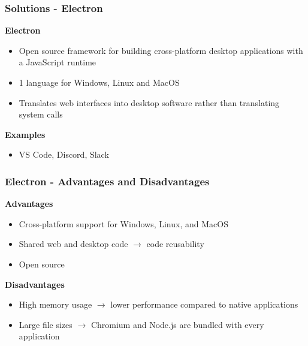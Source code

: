 \begin{frame}
\frametitle{Solutions - Electron}
\begin{redbox}
\textbf{Electron}
\begin{itemize}
    \setlength{\itemsep}{8pt}
    \item Open source framework for building cross-platform desktop applications with a JavaScript runtime \cite{electron-why-page}
    \item 1 language for Windows, Linux and MacOS \cite{electron-why-page}
    \item Translates web interfaces into desktop software rather than translating system calls
\end{itemize}
\end{redbox}
\begin{exbox}
\textbf{Examples}
\begin{itemize}
    \item VS Code, Discord, Slack

\end{itemize}
\end{exbox}

\end{frame}

\begin{frame}
\frametitle{Electron - Advantages and Disadvantages}
\begin{theorembox}
\textbf{Advantages}
\begin{itemize}
    \item Cross-platform support for Windows, Linux, and MacOS
    \item Shared web and desktop code $\rightarrow$ code reusability
    \item Open source
\end{itemize}
\end{theorembox}
\begin{redbox}
\textbf{Disadvantages}
\begin{itemize}
    \item High memory usage $\rightarrow$ lower performance compared to native applications
    \item Large file sizes $\rightarrow$ Chromium and Node.js are bundled with every application
\end{itemize}
\end{redbox}
\end{frame}

